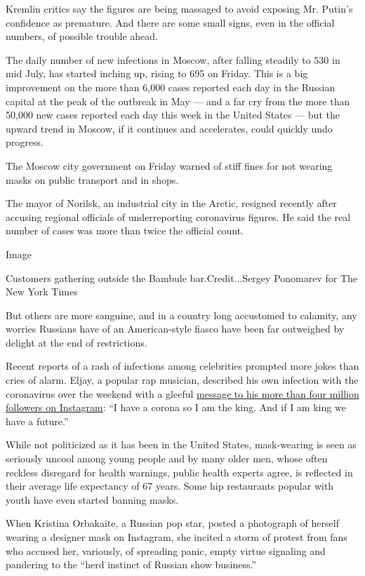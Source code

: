 Kremlin critics say the figures are being massaged to avoid exposing Mr.
Putin's confidence as premature. And there are some small signs, even in
the official numbers, of possible trouble ahead.

The daily number of new infections in Moscow, after falling steadily to
530 in mid July, has started inching up, rising to 695 on Friday. This
is a big improvement on the more than 6,000 cases reported each day in
the Russian capital at the peak of the outbreak in May --- and a far cry
from the more than 50,000 new cases reported each day this week in the
United States --- but the upward trend in Moscow, if it continues and
accelerates, could quickly undo progress.

The Moscow city government on Friday warned of stiff fines for not
wearing masks on public transport and in shops.

The mayor of Norilsk, an industrial city in the Arctic, resigned
recently after accusing regional officials of underreporting coronavirus
figures. He said the real number of cases was more than twice the
official count.

Image

Customers gathering outside the Bambule bar.Credit...Sergey Ponomarev
for The New York Times

But others are more sanguine, and in a country long accustomed to
calamity, any worries Russians have of an American-style fiasco have
been far outweighed by delight at the end of restrictions.

Recent reports of a rash of infections among celebrities prompted more
jokes than cries of alarm. Eljay, a popular rap musician, described his
own infection with the coronavirus over the weekend with a gleeful
\href{https://www.instagram.com/sayonaraboy/}{message to his more than
four million followers on Instagram}: ``I have a corona so I am the
king. And if I am king we have a future.''

While not politicized as it has been in the United States, mask-wearing
is seen as seriously uncool among young people and by many older men,
whose often reckless disregard for health warnings, public health
experts agree, is reflected in their average life expectancy of 67
years. Some hip restaurants popular with youth have even started banning
masks.

When Kristina Orbakaite, a Russian pop star, posted a photograph of
herself wearing a designer mask on Instagram, she incited a storm of
protest from fans who accused her, variously, of spreading panic, empty
virtue signaling and pandering to the ``herd instinct of Russian show
business.''

